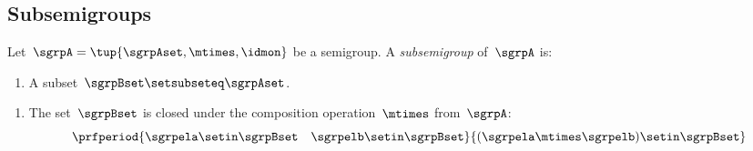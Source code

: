 
\subsection{Subsemigroups}


\begin{definition}
    Let~$\sgrpA = \tup{\sgrpAset, \mtimes, \idmon}$ be a semigroup.
    A \emph{subsemigroup} of~$\sgrpA$ is:

    \constit

    \begin{enumerate}
        \item A subset~$\sgrpBset \setsubseteq \sgrpAset$.
    \end{enumerate}

    \condit

    \begin{enumerate}
        \item The set~$\sgrpBset$ is closed under the composition operation~$\mtimes$ from~$\sgrpA$:
              \begin{equation}
                  \prfperiod{
                      \sgrpela \setin \sgrpBset \quad \sgrpelb \setin \sgrpBset
                  }{
                      (\sgrpela \mtimes \sgrpelb) \setin \sgrpBset
                  }
              \end{equation}
    \end{enumerate}
\end{definition}
